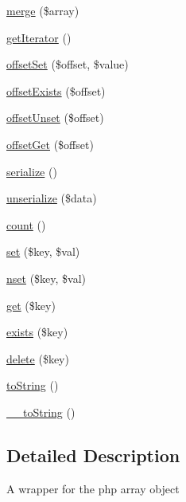 \begin{DoxyCompactItemize}
\item 
\hyperlink{classTk_1_1Util_1_1ArrayObject_afde4b2acc29ad02d0fb87fb360d20d2c}{merge} (\$array)
\item 
\hyperlink{classTk_1_1Util_1_1ArrayObject_a24784b77dfbe5ca2b343f8c2a3029614}{get\+Iterator} ()
\item 
\hyperlink{classTk_1_1Util_1_1ArrayObject_acb1a3d463f815decdab576b03a4dc262}{offset\+Set} (\$offset, \$value)
\item 
\hyperlink{classTk_1_1Util_1_1ArrayObject_a6286851870bdec9355cd8dce9edff6b6}{offset\+Exists} (\$offset)
\item 
\hyperlink{classTk_1_1Util_1_1ArrayObject_ad57a362c3b33ba6e41890cf56fa7697f}{offset\+Unset} (\$offset)
\item 
\hyperlink{classTk_1_1Util_1_1ArrayObject_a6017eafb107be8de0e8ccdb920e04f3c}{offset\+Get} (\$offset)
\item 
\hyperlink{classTk_1_1Util_1_1ArrayObject_a0a0a5c6b36eed7a834d9174fc98eb69d}{serialize} ()
\item 
\hyperlink{classTk_1_1Util_1_1ArrayObject_aa9b0d06d391d1053ac0f582a06073a7b}{unserialize} (\$data)
\item 
\hyperlink{classTk_1_1Util_1_1ArrayObject_a4e8d9b5ea97161a52a6cd90c6ccaf255}{count} ()
\item 
\hyperlink{classTk_1_1Util_1_1ArrayObject_ac5daa15e14f60b51b6457c036796ed4d}{set} (\$key, \$val)
\item 
\hyperlink{classTk_1_1Util_1_1ArrayObject_af6307b4520b9ebf1338affbfc8c4844f}{nset} (\$key, \$val)
\item 
\hyperlink{classTk_1_1Util_1_1ArrayObject_aa3079cb50bd82b253fcded0a3b1f57d5}{get} (\$key)
\item 
\hyperlink{classTk_1_1Util_1_1ArrayObject_aa0524a20e7d99c45c36776bd708da358}{exists} (\$key)
\item 
\hyperlink{classTk_1_1Util_1_1ArrayObject_a2acff7bb427ff2073c7034c9f18f10a9}{delete} (\$key)
\item 
\hyperlink{classTk_1_1Util_1_1ArrayObject_a9466c18c6e4893b2036e07b5508fa453}{to\+String} ()
\item 
\hyperlink{classTk_1_1Util_1_1ArrayObject_a06135715ec8419a3665cd5a3e80c3854}{\+\_\+\+\_\+to\+String} ()
\end{DoxyCompactItemize}


\subsection{Detailed Description}
A wrapper for the php array object

